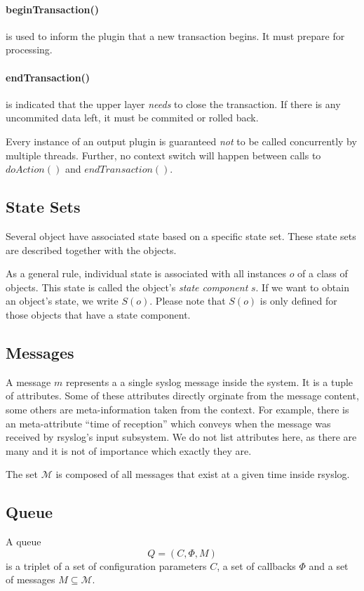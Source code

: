 \documentclass[a4paper,10pt]{article}
\newcommand{\MM}{\mathcal{M}}
\begin{document}
\paragraph{beginTransaction()}
is used to inform the plugin that a new transaction begins. It must prepare for processing.

\paragraph{endTransaction()}
is indicated that the upper layer \emph{needs} to close the transaction. If there is any uncommited data left, it must be commited or rolled back.

Every instance of an output plugin is guaranteed \emph{not} to be called concurrently by multiple threads. Further, no context switch will happen between calls to $doAction()$ and $endTransaction()$.

\subsection{State Sets}
Several object have associated state based on a specific state set. These state sets are described together with the objects.

As a general rule, individual state is associated with all instances $o$ of a class of objects. This state is called the object's  \emph{state component} $s$. If we want to obtain an object's state, we write $S(o)$. Please note that $S(o)$ is only defined for those objects that have a state component.

\subsection{Messages} 
A message $m$ represents a a single syslog message inside the system. It is a tuple of attributes. Some of these attributes directly orginate from the message content, some others are meta-information taken from the context. For example, there is an meta-attribute ``time of reception'' which conveys when the message was received by rsyslog's input subsystem. We do not list attributes here, as there are many and it is not of importance which exactly they are.

The set $\MM$ is composed of all messages that exist at a given time inside rsyslog.

\subsection{Queue}
A queue
$$Q = (C, \Phi, M)$$
is a triplet of a set of configuration parameters $C$, a set of callbacks $\Phi$ and a set of messages $M \subseteq \MM$.
\end{document}
